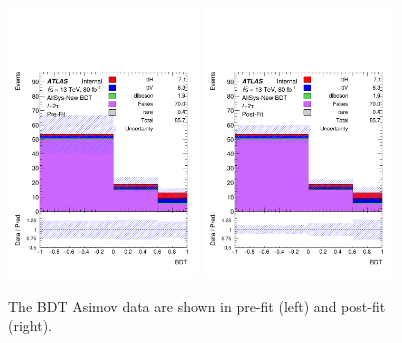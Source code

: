 \begin{figure}[htbp]
\centering
\begin{center}
  \includegraphics[width=0.45\textwidth, keepaspectratio]{fig/OneLepTwoTaus/h1l2tau.pdf}
  \includegraphics[width=0.45\textwidth, keepaspectratio]{fig/OneLepTwoTaus/h1l2tau_postFit.pdf}
\end{center}
\caption{The BDT Asimov data are shown in pre-fit (left) and post-fit (right). 
}
\label{Fig:1l2tau.asimov}
\end{figure}

